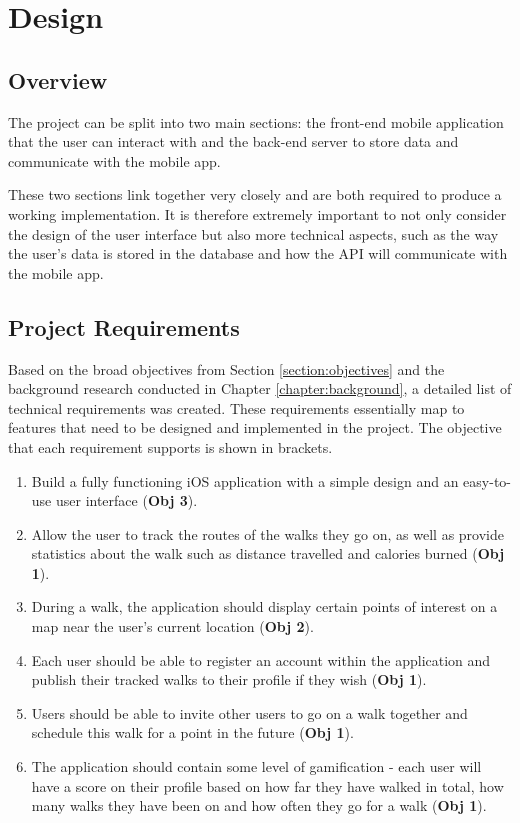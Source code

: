 \chapter{Design} \label{chapter:design}

\section{Overview}

The project can be split into two main sections: the front-end mobile application that the user can interact with and the back-end server to store data and communicate with the mobile app.

These two sections link together very closely and are both required to produce a working implementation. It is therefore extremely important to not only consider the design of the user interface but also more technical aspects, such as the way the user's data is stored in the database and how the API will communicate with the mobile app.

\section{Project Requirements} \label{section:requirements}

Based on the broad objectives from Section \ref{section:objectives} and the background research conducted in Chapter \ref{chapter:background}, a detailed list of technical requirements was created. These requirements essentially map to features that need to be designed and implemented in the project. The objective that each requirement supports is shown in brackets.


\begin{enumerate}[label=\textbf{Req \arabic*}]
    \item Build a fully functioning iOS application with a simple design and an easy-to-use user interface (\textbf{Obj 3}).
    \item Allow the user to track the routes of the walks they go on, as well as provide statistics about the walk such as distance travelled and calories burned (\textbf{Obj 1}).
    \item During a walk, the application should display certain points of interest on a map near the user's current location (\textbf{Obj 2}).
    \item Each user should be able to register an account within the application and publish their tracked walks to their profile if they wish (\textbf{Obj 1}).
    \item Users should be able to invite other users to go on a walk together and schedule this walk for a point in the future (\textbf{Obj 1}).
    \item The application should contain some level of gamification - each user will have a score on their profile based on how far they have walked in total, how many walks they have been on and how often they go for a walk (\textbf{Obj 1}).
\end{enumerate}

